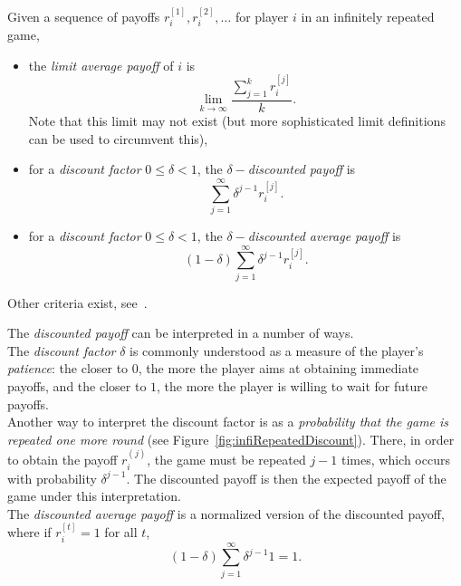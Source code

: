 \begin{definition}
Given a sequence of payoffs $r_i^{[1]}, r_i^{[2]}, \ldots$ for player $i$
in an infinitely repeated game,
\begin{itemize}
    \item the \emph{limit average payoff} of $i$ is
    \begin{equation}
        \lim_{k \rightarrow \infty} \frac{\sum_{j = 1}^k r_i^{[j]}}{k}.
        \label{eq:averagePayoffRep}
    \end{equation}
    Note that this limit may not exist (but more sophisticated
    limit definitions can be used to circumvent this),
    \item for a \emph{discount factor} $0 \leq \delta < 1$, the
    \emph{$\delta-$discounted payoff} is
    \begin{equation}
        \sum_{j = 1}^{\infty} \delta^{j-1} r_i^{[j]}.
        \label{eq:discountedPayoffRep}
    \end{equation}
    \item for a \emph{discount factor} $0 \leq \delta < 1$, the
    \emph{$\delta-$discounted average payoff} is
    \begin{equation}
        (1-\delta) \sum_{j = 1}^{\infty} \delta^{j-1} r_i^{[j]}.
        \label{eq:discountedAvgPayoffRep}
    \end{equation}
\end{itemize}
\end{definition}
Other criteria exist, see~\cite[page 315]{MyGTAO}.

The \emph{discounted payoff} can be interpreted in a number of ways.\\
The \emph{discount factor} $\delta$ is commonly understood as a measure
of the player's \emph{patience}: the closer to $0$, the more the player
aims at obtaining immediate payoffs, and the closer to $1$, the more the
player is willing to wait for future payoffs.\\
Another way to interpret the discount factor is as a \emph{probability
that the game is repeated one more round} (see
Figure~\ref{fig:infiRepeatedDiscount}). There, in order to obtain the
payoff $r_i^{(j)}$, the game must be repeated $j-1$ times, which occurs
with probability $\delta^{j-1}$. The discounted payoff is then the
expected payoff of the game under this interpretation.\\
The \emph{discounted average payoff} is a normalized version of the
discounted payoff, where if $r_i^{[t]} = 1$ for all $t$,
$$(1-\delta) \sum_{j = 1}^{\infty} \delta^{j-1} 1 = 1.$$

